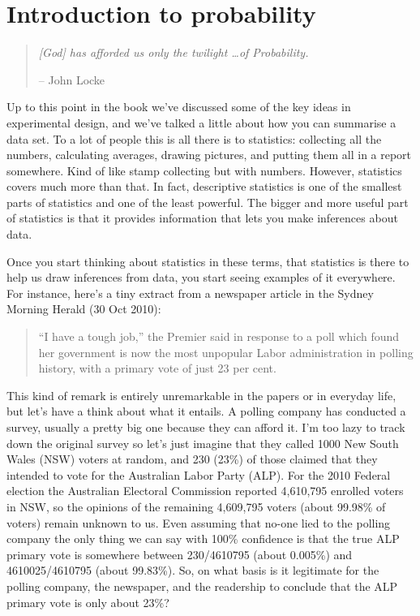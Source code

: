 

\chapter{Introduction to probability\label{ch:probability}}

\begin{quote}
{\it [God] has afforded us only the twilight \ldots of Probability.} 

\hspace*{2cm} -- John Locke
\end{quote}

\vspace*{12pt}
Up to this point in the book we've discussed some of the key ideas in experimental design, and we've talked a little about how you can summarise a data set.  To a lot of people this is all there is to statistics: collecting all the numbers, calculating averages, drawing pictures, and putting them all in a report somewhere. Kind of like stamp collecting but with numbers. However, statistics covers much more than that. In fact, descriptive statistics is one of the smallest parts of statistics and one of the least powerful. The bigger and more useful part of statistics is that it provides information that lets you make inferences about data. 

Once you start thinking about statistics in these terms, that statistics is there to help us draw inferences from data, you start seeing examples of it everywhere. For instance, here's a tiny extract from a newspaper article in the Sydney Morning Herald (30 Oct 2010):

\small
\begin{quote}
``I have a tough job,'' the Premier said in response to a poll which found her government is now the most unpopular Labor administration in polling history, with a primary vote of just 23 per cent.
\end{quote}

\normalsize
This kind of remark is entirely unremarkable in the papers or in everyday life, but let's have a think about what it entails. A polling company has conducted a survey, usually a pretty big one because they can afford it. I'm too lazy to track down the original survey so let's just imagine that they called 1000 New South Wales (NSW) voters at random, and 230 (23\%) of those claimed that they intended to vote for the Australian Labor Party (ALP). For the 2010 Federal election the Australian Electoral Commission reported 4,610,795 enrolled voters in NSW, so the opinions of the remaining 4,609,795 voters (about 99.98\% of voters) remain unknown to us. Even assuming that no-one lied to the polling company the only thing we can say with 100\% confidence is that the true ALP primary vote is somewhere between 230/4610795 (about 0.005\%) and 4610025/4610795 (about 99.83\%). So, on what basis is it legitimate for the polling company, the newspaper, and the readership to conclude that the ALP primary vote is only about 23\%?

